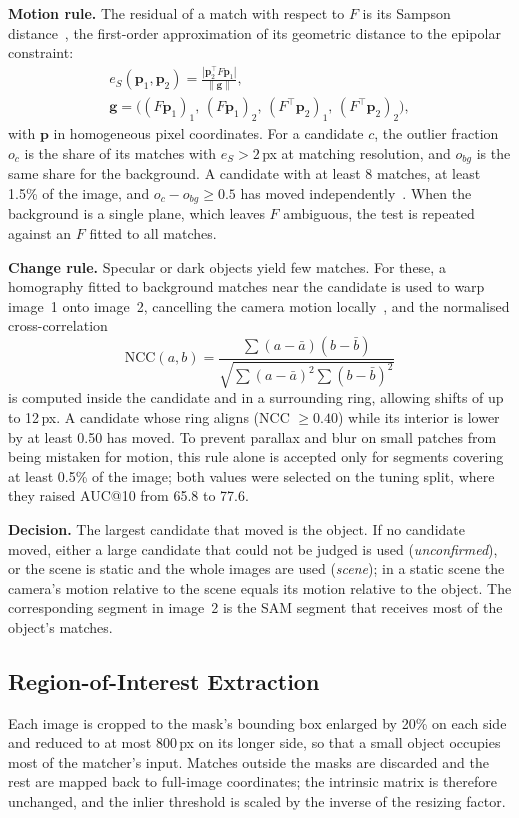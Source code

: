 \documentclass[journal]{IEEEtran}
\begin{document}
\textbf{Motion rule.} The residual of a match with respect to $F$ is its Sampson distance~\cite{hz}, the first-order approximation of its geometric distance to the epipolar constraint:
\begin{gather}
  e_S(\mathbf{p}_1,\mathbf{p}_2)=\frac{|\mathbf{p}_2^\top F\mathbf{p}_1|}{\|\mathbf{g}\|},\label{eq:sampson}\\
  \mathbf{g}=\big((F\mathbf{p}_1)_1,\,(F\mathbf{p}_1)_2,\,(F^\top\mathbf{p}_2)_1,\,(F^\top\mathbf{p}_2)_2\big),\nonumber
\end{gather}
with $\mathbf{p}$ in homogeneous pixel coordinates. For a candidate $c$, the outlier fraction $o_c$ is the share of its matches with $e_S>2$\,px at matching resolution, and $o_{bg}$ is the same share for the background. A candidate with at least 8 matches, at least 1.5\% of the image, and $o_c-o_{bg}\ge 0.5$ has moved independently~\cite{torr}. When the background is a single plane, which leaves $F$ ambiguous, the test is repeated against an $F$ fitted to all matches.

\textbf{Change rule.} Specular or dark objects yield few matches. For these, a homography fitted to background matches near the candidate is used to warp image~1 onto image~2, cancelling the camera motion locally~\cite{irani}, and the normalised cross-correlation~\cite{lewis}
\begin{equation}
  \mathrm{NCC}(a,b) = \frac{\sum (a-\bar a)(b-\bar b)}{\sqrt{\sum (a-\bar a)^2\sum (b-\bar b)^2}}
\end{equation}
is computed inside the candidate and in a surrounding ring, allowing shifts of up to 12\,px. A candidate whose ring aligns (NCC $\ge 0.40$) while its interior is lower by at least 0.50 has moved. To prevent parallax and blur on small patches from being mistaken for motion, this rule alone is accepted only for segments covering at least 0.5\% of the image; both values were selected on the tuning split, where they raised AUC@10 from 65.8 to 77.6.

\textbf{Decision.} The largest candidate that moved is the object. If no candidate moved, either a large candidate that could not be judged is used (\emph{unconfirmed}), or the scene is static and the whole images are used (\emph{scene}); in a static scene the camera's motion relative to the scene equals its motion relative to the object. The corresponding segment in image~2 is the SAM segment that receives most of the object's matches.

\subsection{Region-of-Interest Extraction}
Each image is cropped to the mask's bounding box enlarged by 20\% on each side and reduced to at most 800\,px on its longer side, so that a small object occupies most of the matcher's input. Matches outside the masks are discarded and the rest are mapped back to full-image coordinates; the intrinsic matrix is therefore unchanged, and the inlier threshold is scaled by the inverse of the resizing factor.
\end{document}
